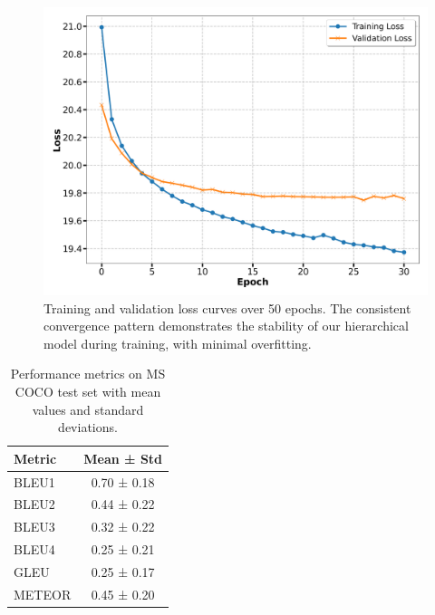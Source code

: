\documentclass[10pt,twocolumn,letterpaper]{article}
\begin{document}
\begin{figure}[h!]
\begin{center}
\includegraphics[width=\columnwidth]{figures/loss_plot.png}
\end{center}
\caption{Training and validation loss curves over 50 epochs. The consistent convergence pattern demonstrates the stability of our hierarchical model during training, with minimal overfitting.}
\label{fig:loss_plot}
\end{figure}

\begin{table}[h!]
\begin{center}
\begin{tabular}{|l|c|}
\hline
Metric & Mean ± Std \\
\hline\hline
BLEU1 & 0.70 ± 0.18 \\
BLEU2 & 0.44 ± 0.22 \\
BLEU3 & 0.32 ± 0.22 \\
BLEU4 & 0.25 ± 0.21 \\
GLEU & 0.25 ± 0.17 \\
METEOR & 0.45 ± 0.20 \\
\hline
\end{tabular}
\end{center}
\caption{Performance metrics on MS COCO test set with mean values and standard deviations.}
\label{tab:metrics}
\end{table}
\end{document}
